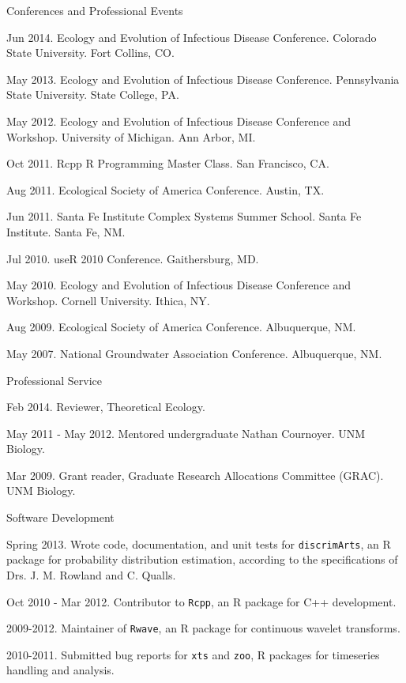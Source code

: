 \documentclass{resume} %
\begin{document}
\begin{rSection}{Conferences and Professional Events}
\item Jun 2014. Ecology and Evolution of Infectious Disease Conference.
Colorado State University.  Fort Collins, CO.
\item May 2013. Ecology and Evolution of Infectious Disease Conference.
Pennsylvania State University.  State College, PA.
\item May 2012. Ecology and Evolution of Infectious Disease Conference
and Workshop.  University of Michigan.  Ann Arbor, MI.
\item Oct 2011. Rcpp R Programming Master Class. San Francisco, CA.
\item Aug 2011. Ecological Society of America Conference. Austin, TX.
\item Jun 2011. Santa Fe Institute Complex Systems Summer School. Santa Fe Institute. Santa Fe, NM. 
\item Jul 2010.  useR 2010 Conference. Gaithersburg, MD. 
\item May 2010. Ecology and Evolution of Infectious Disease Conference
and Workshop.  Cornell University.  Ithica, NY.
\item Aug 2009. Ecological Society of America Conference. Albuquerque, NM.
\item May 2007. National Groundwater Association Conference. Albuquerque, NM. 
\end{rSection}

\begin{rSection}{Professional Service}
\item Feb 2014.  Reviewer, Theoretical Ecology.
\item May 2011 - May 2012. Mentored undergraduate Nathan Cournoyer. UNM Biology.
\item Mar 2009. Grant reader, Graduate Research Allocations Committee (GRAC). UNM Biology.
\end{rSection}

\begin{rSection}{Software Development}
\item Spring 2013. Wrote code, documentation, and unit tests for \texttt{discrimArts}, an R package for probability
distribution estimation, according to the specifications of Drs. J. M. Rowland and C. Qualls.
\item Oct 2010 - Mar 2012. Contributor to \texttt{Rcpp},  an R package for C++ development.
\item 2009-2012. Maintainer of \texttt{Rwave}, an R package for continuous
wavelet transforms.
\item 2010-2011. Submitted bug reports for \texttt{xts} and \texttt{zoo}, R
packages for timeseries handling and analysis.
\end{rSection}




\end{document}
